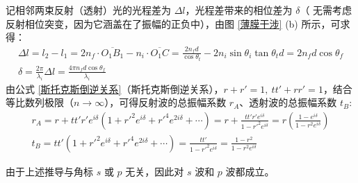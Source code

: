 \documentclass[UTF8]{report}
\theoremstyle{MyLineTheoremStyle} %
\theoremstyle{MyBlockTheoremStyle} %
\theoremstyle{MySubsubsectionStyle} %
\begin{document}
记相邻两束反射（透射）光的光程差为 $\Delta l$，光程差带来的相位差为 $\delta$（{\color{red} 无需考虑反射相位突变，因为它涵盖在了振幅的正负中}），由图 \ref{薄膜干涉} (b) 所示，可求得：
\begin{gather}
    \Delta l = l_2 - l_1 = 2 n_f\cdot  \overline{O_1B_1} - n_i\cdot  \overline{O_1 C} = \frac{2 n_f d}{\cos \theta_t} - 2 n_i \sin \theta_i \tan \theta_t d = 2 n_f d \cos \theta_f \\ 
    \delta = \frac{2 \pi}{\lambda_i} \Delta l = \frac{4 \pi n_f d \cos \theta_f}{\lambda_i}
\end{gather}
由公式 \ref{斯托克斯倒逆关系}（斯托克斯倒逆关系），$r + r' = 1,\ tt' + rr' =1$，结合等比数列极限（$n \to \infty$），可得反射波的总振幅系数 $r_A$、透射波的总振幅系数 $t_B$:
\begin{gather}
    r_A 
    = r + tt'r' e^{i \delta}\left( 1 + r'^2e^{i \delta} +  r'^4e^{2 i \delta} + \cdots\right) 
    = r +  \frac{tt'r'e^{i \delta}}{1 - r'^2e^{i \delta}} 
    = r \left( \frac{1 - e^{i \delta}}{1 - r^2 e^{i \delta}} \right)
    \\ 
    t_B 
    =  tt' \left( 1 + r'^2e^{i \delta} +  r'^4e^{2 i \delta} + \cdots \right) = \frac{tt'}{1 - r'^2e^{i \delta}} = \frac{1 - r^2}{1 - r^2 e^{i \delta}}
\end{gather}

由于上述推导与角标 $s$ 或 $p$ 无关，因此对 $s$ 波和 $p$ 波都成立。
\end{document}
